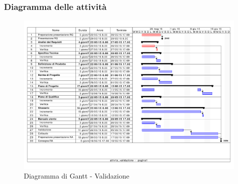 		\subsubsection{Diagramma delle attività} %
		\label{ssub:diagramma_delle_attivita}
			\begin{figure}[htbp]
				\centering
				\centerline{\includegraphics[scale=0.7]{images/d_attivita_validazione.pdf}}
				\caption{Diagramma di Gantt - Validazione}
				\label{fig:gantt_validazione}				
			\end{figure}
	
	
